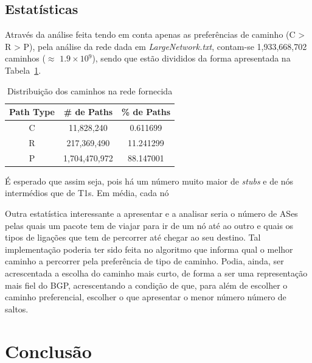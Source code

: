 \documentclass[twocolumn]{article} %
\begin{document}
		\subsection{Estatísticas}
			Através da análise feita tendo em conta apenas as preferências de caminho (C > R > P), pela análise da rede dada em \emph{LargeNetwork.txt}, contam-se 1,933,668,702 caminhos ($\approx$ $1.9\times 10$$^{9}$), sendo que estão divididos da forma apresentada na Tabela~\ref{Tabela1}.\\

			\begin{table}[ht]
				\caption{Distribuição dos caminhos na rede fornecida}
				\begin{center}
					\begin{tabular}{|c||c||c|}
						\hline
						Path Type &	\# de Paths & \% de Paths \\
						\hline
						C & 11,828,240 & 0.611699\\
						\hline
						R & 217,369,490 & 11.241299\\
						\hline
						P & 1,704,470,972 & 88.147001\\
						\hline
					\end{tabular}
				\end{center}
				\label{Tabela1}
			\end{table}

			\noindent É esperado que assim seja, pois há um número muito maior de \emph{stubs} e de nós intermédios que de T1s. Em média, cada nó 

			\noindent Outra estatística interessante a apresentar e a analisar seria o número de ASes pelas quais um pacote tem de viajar para ir de um nó até ao outro e quais os tipos de ligações que tem de percorrer até chegar ao seu destino. Tal implementação poderia ter sido feita no algoritmo que informa qual o melhor caminho a percorrer pela preferência de tipo de caminho. Podia, ainda, ser acrescentada a escolha do caminho mais curto, de forma a ser uma representação mais fiel do BGP, acrescentando a condição de que, para além de escolher o caminho preferencial, escolher o que apresentar o menor número número de saltos.

	\section{Conclusão}
	
\end{document}
